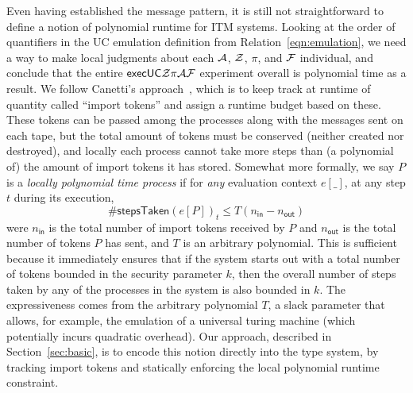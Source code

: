   

Even having established the message pattern, it is still not straightforward to define a notion of polynomial runtime for ITM systems.
Looking at the order of quantifiers in the UC emulation definition from Relation~\ref{eqn:emulation}, we need a way to make local judgments about each $\mathcal{A}$, $\mathcal{Z}$, $\pi$, and $\mathcal{F}$ individual, and conclude that the entire ${\mathsf {execUC}} \mathcal{Z} \pi \mathcal{A} \mathcal{F}$ experiment overall is polynomial time as a result.
We follow Canetti's approach~\cite{canettiUC}, which is to keep track at runtime of quantity called ``import tokens'' and assign a runtime budget based on these.
These tokens can be passed among the processes along with the messages sent on each tape, but the total amount of tokens must be conserved (neither created nor destroyed), and locally each process cannot take more steps than (a polynomial of) the amount of import tokens it has stored.
Somewhat more formally, we say $P$ is a \emph{locally polynomial time process} if for \emph{any} evaluation context $e[\_]$, at any step $t$ during its execution,
\[
\#\textsf{stepsTaken}(e[P])_{t} \le T(n_{\textsf{in}} - n_{\textsf{out}})
\]
were $n_{\textsf{in}}$ is the total number of import tokens received by $P$ and $n_{\textsf{out}}$ is the total number of tokens $P$ has sent, and $T$ is an arbitrary polynomial.
This is sufficient because it immediately ensures that if the system starts out with a total number of tokens bounded in the security parameter $k$, then the overall number of steps taken by any of the processes in the system is also bounded in $k$.
The expressiveness comes from the arbitrary polynomial $T$, a slack parameter that allows, for example, the emulation of a universal turing machine (which potentially incurs quadratic overhead).
Our approach, described in Section~\ref{sec:basic}, is to encode this notion directly into the type system, by tracking import tokens and statically enforcing the local polynomial runtime constraint.

